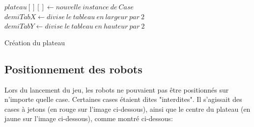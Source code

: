 \documentclass[a4paper, 12pt]{article}
\begin{document}
            
            \begin{algorithm}[H]%
                \DontPrintSemicolon
                $ plateau[][] \gets nouvelle \ instance \ de \ Case $
                $ demiTabX \gets divise \ le \ tableau \ en \ largeur \ par \ 2$
	        	$ demiTabY \gets divise \ le \ tableau \ en \ hauteur \ par \ 2$
                
                
                \caption{\sc Création du plateau}
            \end{algorithm}%
    \newpage
    \subsection{Positionnement des robots}
        Lors du lancement du jeu, les robots ne pouvaient pas être positionnés sur n'importe quelle case. Certaines cases étaient dites "interdites". Il s'agissait des cases à jetons (en rouge sur l'image ci-dessous), ainsi que le centre du plateau (en jaune sur l'image ci-dessous), comme montré ci-dessous:
        
\end{document}
